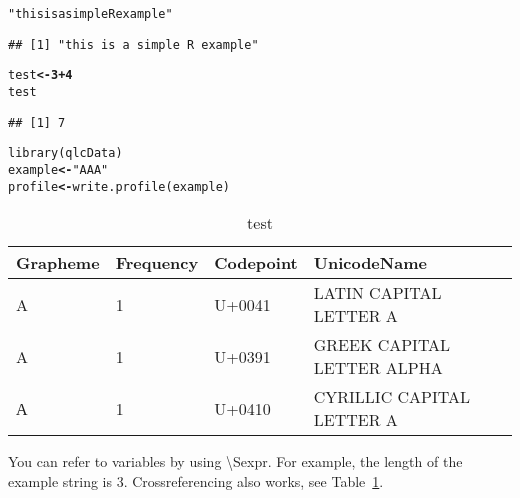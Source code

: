 \documentclass[output=inprep,
		biblatex
		]{LSP/langsci}\usepackage[]{graphicx}\usepackage[]{color}
\makeatletter
\newcommand{\hlnum}[1]{\textcolor[rgb]{0.502,0,0.502}{\textbf{#1}}}%
\newcommand{\hlstr}[1]{\textcolor[rgb]{0.651,0.522,0}{#1}}%
\newcommand{\hlopt}[1]{\textcolor[rgb]{1,0,0.502}{\textbf{#1}}}%
\newcommand{\hlstd}[1]{\textcolor[rgb]{0,0,0}{#1}}%
\newcommand{\hlkwb}[1]{\textcolor[rgb]{0.502,0.502,0.753}{\textbf{#1}}}%
\newcommand{\hlkwd}[1]{\textcolor[rgb]{0,0.267,0.4}{#1}}%
\newenvironment{kframe}{%
 \def\at@end@of@kframe{}%
 \ifinner\ifhmode%
  \def\at@end@of@kframe{\end{minipage}}%
  \begin{minipage}{\columnwidth}%
 \fi\fi%
 \def\FrameCommand##1{\hskip\@totalleftmargin \hskip-\fboxsep
 \colorbox{shadecolor}{##1}\hskip-\fboxsep
     \hskip-\linewidth \hskip-\@totalleftmargin \hskip\columnwidth}%
 \MakeFramed {\advance\hsize-\width
   \@totalleftmargin\z@ \linewidth\hsize
   \@setminipage}}%
 {\par\unskip\endMakeFramed%
 \at@end@of@kframe}
\newenvironment{knitrout}{}{} %
\makeatother
\begin{document}
\begin{knitrout}\scriptsize
{}\color{fgcolor}\begin{kframe}
\begin{alltt}
\hlstr{"this is a simple R example"}
\end{alltt}
\begin{verbatim}
## [1] "this is a simple R example"
\end{verbatim}
\begin{alltt}
\hlstd{test} \hlkwb{<-} \hlnum{3} \hlopt{+} \hlnum{4}
\hlstd{test}
\end{alltt}
\begin{verbatim}
## [1] 7
\end{verbatim}
\end{kframe}
\end{knitrout}

\begin{knitrout}\scriptsize
{}\color{fgcolor}\begin{kframe}
\begin{alltt}
\hlkwd{library}\hlstd{(qlcData)}
\hlstd{example} \hlkwb{<-} \hlstr{"AΑА"}
\hlstd{profile} \hlkwb{<-} \hlkwd{write.profile}\hlstd{(example)}
\end{alltt}
\end{kframe}
\end{knitrout}

\begin{table}[H]
\centering
{\small
\begin{tabular}{llll}
  \toprule
Grapheme & Frequency & Codepoint & UnicodeName \\ 
  \midrule
A & 1 & U+0041 & LATIN CAPITAL LETTER A \\ 
  Α & 1 & U+0391 & GREEK CAPITAL LETTER ALPHA \\ 
  А & 1 & U+0410 & CYRILLIC CAPITAL LETTER A \\ 
   \bottomrule
\end{tabular}
}
\caption{test} 
\label{bla}
\end{table}




You can refer to variables by using \textbackslash Sexpr{}. 
For example, the length of the example string is 3.
Crossreferencing also works, see Table~\ref{bla}.
\end{document}
